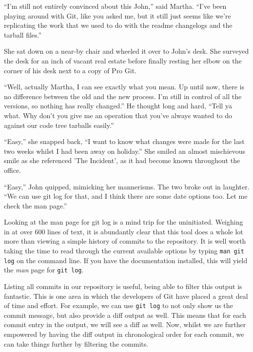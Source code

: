 \begin{trenches}
``I'm still not entirely convinced about this John,'' said Martha.
``I've been playing around with Git, like you asked me, but it still just seems like we're replicating the work that we used to do with the readme changelogs and the tarball files.''

She sat down on a near-by chair and wheeled it over to John's desk.
She surveyed the desk for an inch of vacant real estate before finally resting her elbow on the corner of his desk next to a copy of Pro Git.

``Well, actually Martha, I can see exactly what you mean. Up until now, there is no difference between the old and the new process. I'm still in control of all the versions, so nothing has really changed.''
He thought long and hard, ``Tell ya what. Why don't you give me an operation that you've always wanted to do against our code tree tarballs easily.''

``Easy,'' she snapped back,
``I want to know what changes were made for the last two weeks whilst I had been away on holiday.''
She smiled an almost mischievous smile as she referenced 'The Incident', as it had become known throughout the office.

``Easy,'' John quipped, mimicking her mannerisms.
The two broke out in laughter.
``We can use git log for that, and I think there are some date options too. Let me check the man page.''
\end{trenches}

Looking at the man page for git log is a mind trip for the uninitiated.
Weighing in at over 600 lines of text, it is abundantly clear that this tool does a whole lot more than viewing a simple history of commits to the repository.
It is well worth taking the time to read through the current available options by typing \texttt{man git log} on the command line.
If you have the documentation installed, this will yield the \emph{man} page for \texttt{git log}.

Listing all commits in our repository is useful, being able to filter this output is fantastic.
This is one area in which the developers of Git have placed a great deal of time and effort.
For example, we can use \texttt{git log} to not only show us the commit message, but also provide a diff output as well.
This means that for each commit entry in the output, we will see a diff as well.
Now, whilst we are further empowered by having the diff output in chronological order for each commit, we can take things further by filtering the commits.

